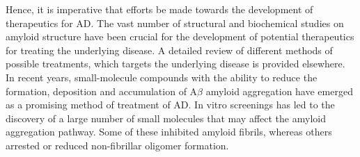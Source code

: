 

Hence, it is imperative that efforts be made towards the development of therapeutics for AD. The vast number of structural and biochemical studies on amyloid structure have been crucial for the development of potential therapeutics for treating the underlying disease. A detailed review of different methods of possible treatments, which targets the underlying disease is provided elsewhere.\cite{Salomone:2012fh} In recent years, small-molecule compounds with the ability to reduce the formation, deposition and accumulation of A$\beta$ amyloid aggregation have emerged as a promising method of treatment of AD. 
In vitro screenings has led to the discovery of a large number of small molecules that may affect the amyloid aggregation pathway.\cite{Ryan:2012bh} Some of these inhibited amyloid fibrils, whereas others arrested or reduced non-fibrillar oligomer formation.\cite{Necula:2007p5049,LeVine:2007jd} %

